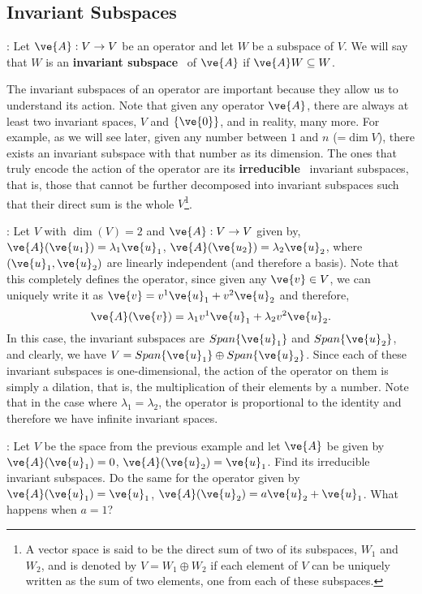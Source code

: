 \subsection{Invariant Subspaces}
\label{Subespacios_Invariantes}

: Let $\ve{A}: V \to V$ be an operator and let $W$ be a subspace of $V$. 
We will say that $W$ is an \textbf{invariant subspace}~ 
of $\ve{A}$ if $\ve{A}W \subseteq W$.

The invariant subspaces of an operator are important because they allow us to understand its action.
Note that given any operator $\ve{A}$, there are always at least two invariant spaces, $V$ and $\{\ve{0}\}$, and in reality, many more. For example, as we will see later, given any number between $1$ and $n$ (=$\dim V$), there exists an invariant subspace with that number as its dimension. The ones that truly encode the action of the operator are its 
\textbf{irreducible}~ 
invariant subspaces, that is, those that cannot be further decomposed into invariant subspaces such that their direct sum is the whole $V$\footnote{A vector space is said to be the direct sum of two of its subspaces, $W_1$ and $W_2$, and is denoted by $V=W_1 \oplus W_2$ if each element of $V$ can be uniquely written as the sum of two elements, one from each of these subspaces.}.
\espa

\ejem: Let $V$ with $\dim(V)=2$ and $\ve{A}: V \to V$ given by, $\ve{A}(\ve{u_1}) = \lambda_1 \ve{u}_1$,
$\ve{A}(\ve{u_2}) = \lambda_2 \ve{u}_2$, where $(\ve{u}_1, \ve{u}_2)$ are linearly independent (and therefore a basis). Note that this completely defines the operator, since given any $\ve{v} \in V$, we can uniquely write it as $\ve{v} = v^1 \ve{u}_1 + v^2 \ve{u}_2$ and therefore, 
\[
\ve{A}(\ve{v}) = \lambda_1 v^1 \ve{u}_1 + \lambda_2 v^2 \ve{u}_2.
\]
In this case, the invariant subspaces are $Span\{\ve{u}_1\}$ and $Span\{\ve{u}_2\}$, and clearly, we have 
$V= Span\{\ve{u}_1\} \oplus Span\{\ve{u}_2\}$. Since each of these invariant subspaces is one-dimensional, the action of the operator on them is simply a dilation, that is, the multiplication of their elements by a number. Note that in the case where $\lambda_1=\lambda_2$, the operator is proportional to the identity and therefore we have infinite invariant spaces.

\ejer: Let $V$ be the space from the previous example and let $\ve{A}$ be given by $\ve{A}(\ve{u}_1) = 0$,  $\ve{A}(\ve{u}_2) = \ve{u}_1$. Find its irreducible invariant subspaces. Do the same for the operator given by 
$\ve{A}(\ve{u}_1) = \ve{u}_1$,  $\ve{A}(\ve{u}_2) = a \ve{u}_2 + \ve{u}_1$. What happens when $a=1$?

